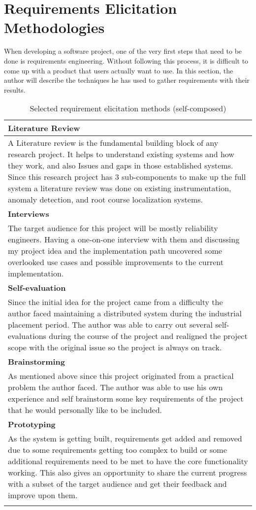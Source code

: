 \section{Requirements Elicitation Methodologies}

When developing a software project, one of the very first steps that need to be done is requirements engineering. Without following this process, it is difficult to come up with a product that users actually want to use. In this section, the author will describe the techniques he has used to gather requirements with their results.

\begin{longtable}{|p{160mm}|}
\hline
\textbf{Literature Review} \\ \hline
A Literature review is the fundamental building block of any research project. It helps to understand existing systems and how they work, and also Issues and gaps in those established systems. Since this research project has 3 sub-components to make up the full system a literature review was done on existing instrumentation, anomaly detection, and root course localization systems. \\ \hline

\textbf{Interviews} \\ \hline
The target audience for this project will be mostly reliability engineers. Having a one-on-one interview with them and discussing my project idea and the implementation path uncovered some overlooked use cases and possible improvements to the current implementation. \\ \hline


\textbf{Self-evaluation} \\ \hline
Since the initial idea for the project came from a difficulty the author faced maintaining a distributed system during the industrial placement period. The author was able to carry out several self-evaluations during the course of the project and realigned the project scope with the original issue so the project is always on track. \\ \hline

\textbf{Brainstorming} \\ \hline
As mentioned above since this project originated from a practical problem the author faced. The author was able to use his own experience and self brainstorm some key requirements of the project that he would personally like to be included. \\ \hline

\textbf{Prototyping} \\ \hline
As the system is getting built, requirements get added and removed due to some requirements getting too complex to build or some additional requirements need to be met to have the core functionality working. This also gives an opportunity to share the current progress with a subset of the target audience and get their feedback and improve upon them. \\ \hline

\caption{Selected requirement elicitation methods (self-composed)}
\end{longtable}
